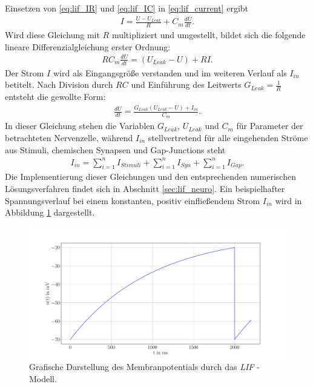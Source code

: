 	Einsetzen von \eqref{eq:lif_IR} und \eqref{eq:lif_IC} in \eqref{eq:lif_current} ergibt
	\begin{align}
		\label{eq:lif_I}
		I = \frac{U - U_{Leak}}{R} + C_m\frac{dU}{dt}\text{.}
	\end{align}
	Wird diese Gleichung mit $R$ multipliziert und umgestellt, bildet sich die folgende lineare Differenzialgleichung erster Ordnung:
	\begin{align}
		\label{eq:lif_nd}
		R C_m \frac{dU}{dt} = (U_{Leak} - U) + R I\text{.}
	\end{align}
	Der Strom $I$ wird als Eingangsgröße verstanden und im weiteren Verlauf als $I_{in}$ betitelt. Nach Division durch $RC$ und Einführung des Leitwerts $G_{Leak} = \tfrac{1}{R}$ entsteht die gewollte Form:
	\begin{align}
		\label{eq:lif}
		\frac{dU}{dt} = \frac{G_{Leak}(U_{Leak} - U) + I_{in}}{C_m}\text{.}
	\end{align}
	In dieser Gleichung stehen die Variablen $G_{Leak}$, $U_{Leak}$ und $C_m$ für Parameter der betrachteten Nervenzelle, während $I_{in}$ stellvertretend für alle eingehenden Ströme aus Stimuli, chemischen Synapsen und Gap-Junctions steht
	\begin{align}
		\label{eq:lif_current_in}
		I_{in} = \sum_{i = 1}^{n}{I_{Stimuli}} + \sum_{i = 1}^{n}{I_{Syn}} + \sum_{i = 1}^{n}{I_{Gap}}\text{.}
	\end{align}
	Die Implementierung dieser Gleichungen und den entsprechenden numerischen Lösungsverfahren findet sich in Abschnitt \ref{sec:lif_neuro}. Ein beispielhafter Spannungsverlauf bei einem konstanten, positiv einfließendem Strom $I_{in}$ wird in Abbildung \ref{fig:simple_lif} dargestellt.
	\begin{figure}[h]
		\centering
		\includegraphics[width=14cm]{figures/chap_lif/Simple_LIF.pdf}
		\caption{Grafische Darstellung des Membranpotentials durch das \textit{LIF} - Modell.}
		\label{fig:simple_lif}
	\end{figure}
